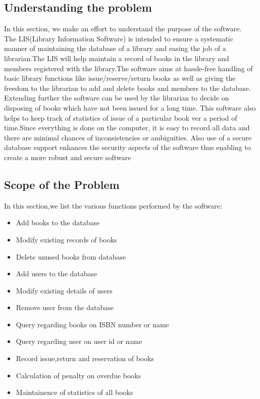 \documentclass[a4paper]{article}
\begin{document}
\subsection{Understanding the problem}
In this section, we make an effort to understand the purpose of the software.
\\
The LIS(Library Information Software) is intended to ensure a systematic manner of maintaining the database of a library and easing the job of a librarian.The LIS will help maintain a record of books in the library and members registered with the library.The software aims at hassle-free handling of basic library functions like issue/reserve/return books as well as giving the freedom to the librarian to add and delete books and members to the database.
	Extending further the software can be used by the librarian to decide on disposing of books which have not been issued for a long time. This software also helps to keep track of statistics of issue of a particular book ver a period of time.Since everything is done on the computer, it is easy to record all data and there are minimal chances of inconsistencies or ambiguities.
Also use of a secure database support enhances the security aspects of the software thus enabling to create a more robust and secure software
\subsection{Scope of the Problem}
In this section,we list the various functions performed by the software:
\begin{itemize}
\item Add books to the database
\item Modify existing records of books
\item Delete unused books from database
\item Add users to the database
\item Modify existing details of users
\item Remove user from the database
\item Query regarding books on ISBN number or name
\item Query regarding user on user id or name
\item Record issue,return and reservation of books
\item Calculation of penalty on overdue books
\item Maintainence of statistics of all books 
\end{itemize}
\end{document}
